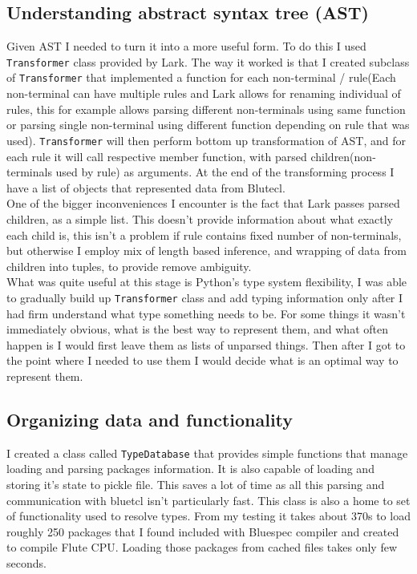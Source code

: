 \documentclass[14pt]{report}
\begin{document}
\subsection{Understanding abstract syntax tree (AST)}
Given AST I needed to turn it into a more useful form. To do this I used \verb!Transformer! class provided by Lark. The way it worked is that I created subclass of \verb!Transformer! that implemented a function for each non-terminal / rule(Each non-terminal can have multiple rules and Lark allows for renaming individual of rules, this for example allows parsing different non-terminals using same function or parsing single non-terminal using different function depending on rule that was used). \verb!Transformer! will then perform bottom up transformation of AST, and for each rule it will call respective member function, with parsed children(non-terminals used by rule) as arguments. At the end of the transforming process I have a list of objects that represented data from Blutecl.
\\
One of the bigger inconveniences I encounter is the fact that Lark passes parsed children, as a simple list. This doesn't provide information about what exactly each child is, this isn't a problem if rule contains fixed number of non-terminals, but otherwise I employ mix of length based inference, and wrapping of data from children into tuples, to provide remove ambiguity.
\\
What was quite useful at this stage is Python's type system flexibility, I was able to gradually build up \verb!Transformer! class and add typing information only after I had firm understand what type something needs to be. For some things it wasn't immediately obvious, what is the best way to represent them, and what often happen is I would first leave them as lists of unparsed things. Then after I got to the point where I needed to use them I would decide what is an optimal way to represent them.

\subsection{Organizing data and functionality}
I created a class called \verb!TypeDatabase! that provides simple functions that manage loading and parsing packages information. It is also capable of loading and storing it's state to pickle file. This saves a lot of time as all this parsing and communication with bluetcl isn't particularly fast. This class is also a home to set of functionality used to resolve types. From my testing it takes about 370s to load roughly 250 packages that I found included with Bluespec compiler and created to compile Flute CPU. Loading those packages from cached files takes only few seconds.
\end{document}

